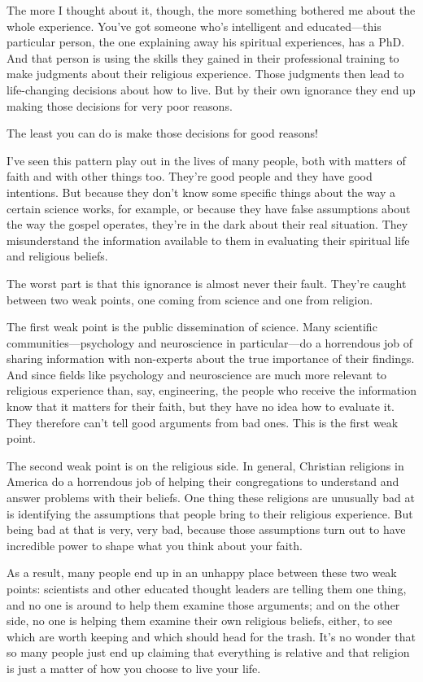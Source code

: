 The more I thought about it, though, the more something bothered me about the whole experience. You’ve got someone who’s intelligent and educated—this particular person, the one explaining away his spiritual experiences, has a PhD. And that person is using the skills they gained in their professional training to make judgments about their religious experience. Those judgments then lead to life-changing decisions about how to live. But by their own ignorance they end up making those decisions for very poor reasons.

The least you can do is make those decisions for good reasons!

I’ve seen this pattern play out in the lives of many people, both with matters of faith and with other things too. They’re good people and they have good intentions. But because they don’t know some specific things about the way a certain science works, for example, or because they have false assumptions about the way the gospel operates, they’re in the dark about their real situation. They misunderstand the information available to them in evaluating their spiritual life and religious beliefs.

The worst part is that this ignorance is almost never their fault. They’re caught between two weak points, one coming from science and one from religion.

The first weak point is the public dissemination of science. Many scientific communities—psychology and neuroscience in particular—do a horrendous job of sharing information with non-experts about the true importance of their findings. And since fields like psychology and neuroscience are much more relevant to religious experience than, say, engineering, the people who receive the information know that it matters for their faith, but they have no idea how to evaluate it. They therefore can’t tell good arguments from bad ones. This is the first weak point.

The second weak point is on the religious side. In general, Christian religions in America do a horrendous job of helping their congregations to understand and answer problems with their beliefs. One thing these religions are unusually bad at is identifying the assumptions that people bring to their religious experience. But being bad at that is very, very bad, because those assumptions turn out to have incredible power to shape what you think about your faith.

As a result, many people end up in an unhappy place between these two weak points: scientists and other educated thought leaders are telling them one thing, and no one is around to help them examine those arguments; and on the other side, no one is helping them examine their own religious beliefs, either, to see which are worth keeping and which should head for the trash. It’s no wonder that so many people just end up claiming that everything is relative and that religion is just a matter of how you choose to live your life.

